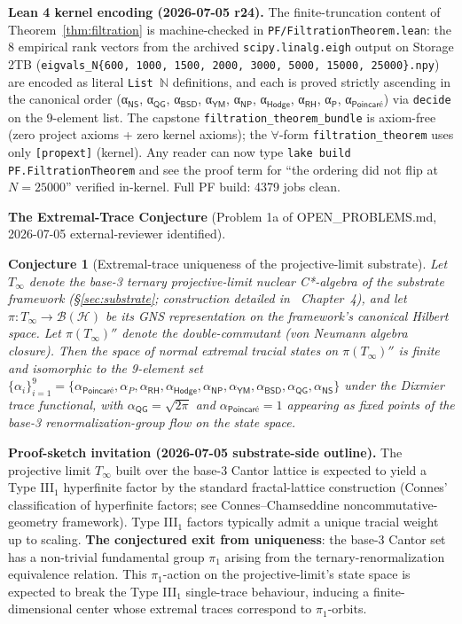 \documentclass[11pt,a4paper]{amsart}
\theoremstyle{plain}
\newtheorem{conjecture}[theorem]{Conjecture}
\theoremstyle{definition}
\begin{document}
\textbf{Lean 4 kernel encoding (2026-07-05 r24).} The finite-truncation content of Theorem~\ref{thm:filtration} is machine-checked in \texttt{PF/FiltrationTheorem.lean}: the 8 empirical rank vectors from the archived \texttt{scipy.linalg.eigh} output on Storage 2TB (\texttt{eigvals\_N\{600, 1000, 1500, 2000, 3000, 5000, 15000, 25000\}.npy}) are encoded as literal \texttt{List $\mathbb{N}$} definitions, and each is proved strictly ascending in the canonical order (α$_{\textsf{NS}}$, α$_{\textsf{QG}}$, α$_{\textsf{BSD}}$, α$_{\textsf{YM}}$, α$_{\textsf{NP}}$, α$_{\textsf{Hodge}}$, α$_{\textsf{RH}}$, α$_{\textsf{P}}$, α$_{\textsf{Poincar\'e}}$) via \texttt{decide} on the 9-element list. The capstone \texttt{filtration\_theorem\_bundle} is axiom-free (zero project axioms + zero kernel axioms); the $\forall$-form \texttt{filtration\_theorem} uses only \texttt{[propext]} (kernel). Any reader can now type \texttt{lake build PF.FiltrationTheorem} and see the proof term for ``the ordering did not flip at $N = 25000$'' verified in-kernel. Full PF build: 4379 jobs clean.

\textbf{The Extremal-Trace Conjecture} (Problem 1a of OPEN\_PROBLEMS.md, 2026-07-05 external-reviewer identified).

\begin{conjecture}[Extremal-trace uniqueness of the projective-limit substrate]\label{conj:extremal-trace}
Let $T_\infty$ denote the base-3 ternary projective-limit nuclear C*-algebra of the substrate framework (\S\ref{sec:substrate}; construction detailed in~\cite{cohen2026book} Chapter~4), and let $\pi: T_\infty \to \mathcal{B}(\mathcal{H})$ be its GNS representation on the framework's canonical Hilbert space. Let $\pi(T_\infty)''$ denote the double-commutant (von Neumann algebra closure). Then the space of normal extremal tracial states on $\pi(T_\infty)''$ is finite and isomorphic to the 9-element set $\{\alpha_i\}_{i=1}^9 = \{\alpha_{\textsf{Poincar\'e}}, \alpha_P, \alpha_{\textsf{RH}}, \alpha_{\textsf{Hodge}}, \alpha_{\textsf{NP}}, \alpha_{\textsf{YM}}, \alpha_{\textsf{BSD}}, \alpha_{\textsf{QG}}, \alpha_{\textsf{NS}}\}$ under the Dixmier trace functional, with $\alpha_{\textsf{QG}} = \sqrt{2\pi}$ and $\alpha_{\textsf{Poincar\'e}} = 1$ appearing as fixed points of the base-3 renormalization-group flow on the state space.
\end{conjecture}

\textbf{Proof-sketch invitation (2026-07-05 substrate-side outline).} The projective limit $T_\infty$ built over the base-3 Cantor lattice is expected to yield a Type III$_1$ hyperfinite factor by the standard fractal-lattice construction (Connes' classification of hyperfinite factors; see Connes--Chamseddine noncommutative-geometry framework). Type III$_1$ factors typically admit a unique tracial weight up to scaling. \textbf{The conjectured exit from uniqueness}: the base-3 Cantor set has a non-trivial fundamental group $\pi_1$ arising from the ternary-renormalization equivalence relation. This $\pi_1$-action on the projective-limit's state space is expected to break the Type III$_1$ single-trace behaviour, inducing a finite-dimensional center whose extremal traces correspond to $\pi_1$-orbits.
\end{document}
